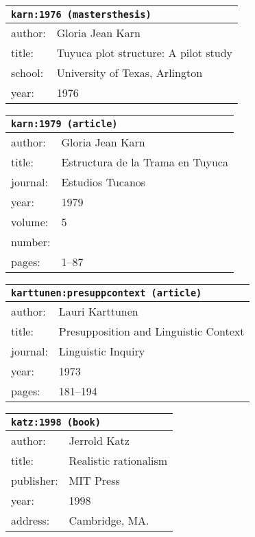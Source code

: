 \documentclass{article}
\begin{document}
\bigskip

\begin{tabular}{p{}p{}}
\multicolumn{2}{l}{\texttt{karn:1976 (mastersthesis)}}\\
\hline
author: & Gloria Jean Karn\\
title: & Tuyuca plot structure: A pilot study\\
school: & University of Texas, Arlington\\
year: & 1976\\
\end{tabular}

\bigskip

\begin{tabular}{p{}p{}}
\multicolumn{2}{l}{\texttt{karn:1979 (article)}}\\
\hline
author: & Gloria Jean Karn\\
title: & Estructura de la Trama en Tuyuca\\
journal: & Estudios Tucanos\\
year: & 1979\\
volume: & 5\\
number: & \\
pages: & 1--87 \\
\end{tabular}

\bigskip

\begin{tabular}{p{}p{}}
\multicolumn{2}{l}{\texttt{karttunen:presuppcontext (article)}}\\
\hline
author: & Lauri Karttunen\\
title: & Presupposition and Linguistic Context\\
journal: & Linguistic Inquiry\\
year: & 1973\\
pages: & 181--194\\
\end{tabular}

\bigskip

\begin{tabular}{p{}p{}}
\multicolumn{2}{l}{\texttt{katz:1998 (book)}}\\
\hline
author: & Jerrold Katz\\
title: & Realistic rationalism\\
publisher: & MIT Press\\
year: & 1998\\
address: & Cambridge, MA.\\
\end{tabular}
\end{document}
